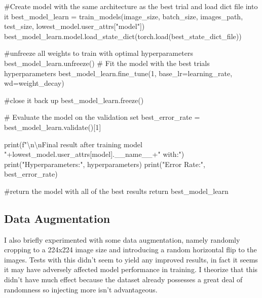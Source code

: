 \documentclass[
  letterpaper,
  DIV=11,
  numbers=noendperiod]{scrartcl}
\newenvironment{Shaded}{\begin{snugshade}}{\end{snugshade}}
\newcommand{\BuiltInTok}[1]{\textcolor[rgb]{0.00,0.23,0.31}{#1}}
\newcommand{\CharTok}[1]{\textcolor[rgb]{0.13,0.47,0.30}{#1}}
\newcommand{\CommentTok}[1]{\textcolor[rgb]{0.37,0.37,0.37}{#1}}
\newcommand{\ControlFlowTok}[1]{\textcolor[rgb]{0.00,0.23,0.31}{#1}}
\newcommand{\DecValTok}[1]{\textcolor[rgb]{0.68,0.00,0.00}{#1}}
\newcommand{\NormalTok}[1]{\textcolor[rgb]{0.00,0.23,0.31}{#1}}
\newcommand{\OperatorTok}[1]{\textcolor[rgb]{0.37,0.37,0.37}{#1}}
\newcommand{\SpecialStringTok}[1]{\textcolor[rgb]{0.13,0.47,0.30}{#1}}
\newcommand{\StringTok}[1]{\textcolor[rgb]{0.13,0.47,0.30}{#1}}
\newcommand{\VariableTok}[1]{\textcolor[rgb]{0.07,0.07,0.07}{#1}}
\begin{document}
\begin{Shaded}
\begin{Highlighting}[]
    \CommentTok{\#Create model with the same architecture as the best trial and load dict file into it}
\NormalTok{    best\_model\_learn }\OperatorTok{=}\NormalTok{ train\_models(image\_size, batch\_size, images\_path, test\_size, lowest\_model.user\_attrs[}\StringTok{"model"}\NormalTok{])}
\NormalTok{    best\_model\_learn.model.load\_state\_dict(torch.load(best\_state\_dict\_file))}

    \CommentTok{\#unfreeze all weights to train with optimal hyperparameters}
\NormalTok{    best\_model\_learn.unfreeze()}
    \CommentTok{\# Fit the model with the best trial\textquotesingle{}s hyperparameters}
\NormalTok{    best\_model\_learn.fine\_tune(}\DecValTok{1}\NormalTok{, base\_lr}\OperatorTok{=}\NormalTok{learning\_rate, wd}\OperatorTok{=}\NormalTok{weight\_decay)}

    \CommentTok{\#close it back up}
\NormalTok{    best\_model\_learn.freeze()}
    
    \CommentTok{\# Evaluate the model on the validation set}
\NormalTok{    best\_error\_rate }\OperatorTok{=}\NormalTok{ best\_model\_learn.validate()[}\DecValTok{1}\NormalTok{]}
    
    \BuiltInTok{print}\NormalTok{(}\SpecialStringTok{f"}\CharTok{\textbackslash{}n\textbackslash{}n}\SpecialStringTok{Final result after training model "}\OperatorTok{+}\NormalTok{lowest\_model.user\_attrs[}\StringTok{\textquotesingle{}model\textquotesingle{}}\NormalTok{].}\VariableTok{\_\_name\_\_}\OperatorTok{+}\StringTok{" with:"}\NormalTok{)}
    \BuiltInTok{print}\NormalTok{(}\StringTok{"Hyperparameters:"}\NormalTok{, hyperparameters)}
    \BuiltInTok{print}\NormalTok{(}\StringTok{"Error Rate:"}\NormalTok{, best\_error\_rate)}

    
    \CommentTok{\#return the model with all of the best results}
    \ControlFlowTok{return}\NormalTok{ best\_model\_learn}
\end{Highlighting}
\end{Shaded}

\hypertarget{data-augmentation}{%
\subsection{Data Augmentation}\label{data-augmentation}}

I also briefly experimented with some data augmentation, namely randomly
cropping to a 224x224 image size and introducing a random horizontal
flip to the images. Tests with this didn't seem to yield any improved
results, in fact it seems it may have adversely affected model
performance in training. I theorize that this didn't have much effect
because the dataset already possesses a great deal of randomness so
injecting more isn't advantageous.
\end{document}
